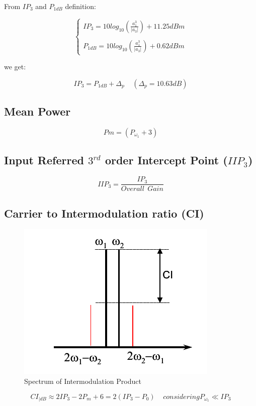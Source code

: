 From $IP_3$ and $P_{1dB}$ definition:

\[
\begin{cases}
	IP_3 = 10log_{10}\left(\frac{a_1^3}{|a_3|}\right) + 11.25dBm\\
	\\
	P_{1dB}= 10log_{10}\left(\frac{a_1^3}{|a_3|}\right) +0.62dBm
\end{cases}
\]

we get:

\begin{equation}
	IP_3= P_{1dB} + \Delta_p \ \ \ \ \ (\Delta_p = 10.63dB)
\end{equation}

\subsection{Mean Power} %
\label{sub:mean_power}
\begin{equation}
Pm =(P_{\omega_1}+3)
\end{equation}


\subsection{Input Referred $3^{rd}$ order Intercept Point ($IIP_3$)} %
\label{sub:input_referred_3_rd_order_intercept_point_iip_3_}
\begin{equation}
	\label{eq:iip3}
	IIP_3= \frac{IP_3}{Overall \ \ Gain}
\end{equation}


\subsection{Carrier to Intermodulation ratio (CI)} %
\label{sub:ci_carrier_to_intermodulation_ratio}


\begin{figure}[ht]
	\centering
	\includegraphics[scale=0.4]{Immagini/ci}
	\caption{Spectrum of Intermodulation Product}
	\label{fig:ci}
\end{figure}
\begin{equation}
	CI_{|dB} \approx 2IP_3 - 2P_m +6= 2(IP_3-P_0) \ \ \ \ \ considering P_{\omega_1} \ll IP_3
\end{equation}

